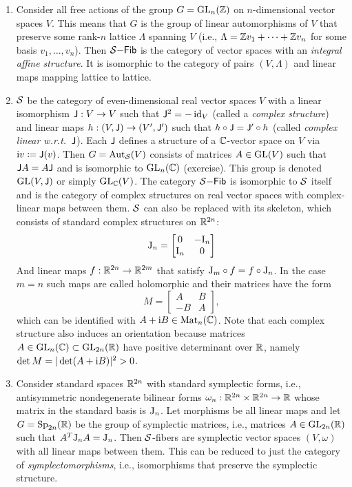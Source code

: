 \begin{example}
\begin{enumerate}
        \item Consider all free actions of the group $G=\operatorname{GL}_n(\mathbb{Z})$ on $n$-dimensional vector spaces $V$. This means that $G$ is the group of linear automorphisms of $V$ that preserve some rank-$n$ lattice $\Lambda$ spanning $V$ (i.e., $\Lambda=\mathbb{Z} v_1+\cdots +\mathbb{Z} v_n$ for some basis $v_1,\ldots,v_n$). Then $\mathcal{S}\mathsf{-Fib}$ is the category of vector spaces with an \emph{integral affine structure}. It is isomorphic to the category of pairs $(V,\Lambda)$ and linear maps mapping lattice to lattice.

        \item $\mathcal{S}$ be the category of even-dimensional real vector spaces $V$ with a linear isomorphism $\mathsf{J}:V\to V$ such that $\mathsf{J}^2=-\operatorname{id}_V$ (called a \emph{complex structure}) and linear maps $h:(V,\mathsf{J})\to(V',\mathsf{J}')$ such that $h\circ \mathsf{J}=\mathsf{J}'\circ h$ (called \emph{complex linear w.r.t.\ $\mathsf{J}$}). Each $\mathsf{J}$ defines a structure of a $\mathbb{C}$-vector space on $V$ via $\mathrm{i} v\coloneqq\mathsf{J}(v)$. Then $G=\operatorname{Aut}_{\mathcal{S}}(V)$ consists of matrices $A\in\operatorname{GL}(V)$ such that $\mathsf{J} A=A\mathsf{J}$ and is isomorphic to $\operatorname{GL}_n(\mathbb{C})$ (exercise). This group is denoted $\operatorname{GL}(V,\mathsf{J})$ or simply $\operatorname{GL}_{\mathbb{C}}(V)$. The category $\mathcal{S}\mathsf{-Fib}$ is isomorphic to $\mathcal{S}$ itself and is the category of complex structures on real vector spaces with complex-linear maps between them. $\mathcal{S}$ can also be replaced with its skeleton, which consists of standard complex structures on $\mathbb{R}^{2n}$:
        \[\mathrm{J}_{n}=\begin{bmatrix}
            0&-\mathrm{I}_n\\
            \mathrm{I}_n&0
        \end{bmatrix}\]
        And linear maps $f:\mathbb{R}^{2n}\to \mathbb{R}^{2m}$ that satisfy $\mathrm{J}_{m}\circ f=f\circ \mathrm{J}_{n}$. In the case $m=n$ such maps are called holomorphic and their matrices have the form 
        \[M=\begin{bmatrix}
            A&B\\
            -B&A
        \end{bmatrix},\label{eq complex matrices}\]
        which can be identified with $A+\mathrm{i} B\in \operatorname{Mat}_n(\mathbb{C})$.
        Note that each complex structure also induces an orientation because matrices $A\in \operatorname{GL}_n(\mathbb{C})\subset \operatorname{GL}_{2n}(\mathbb{R})$ have positive determinant over $\mathbb{R}$, namely $\det M=|\det(A+\mathrm{i} B)|^2>0$.

        \item Consider standard spaces $\mathbb{R}^{2n}$ with standard symplectic forms, i.e., antisymmetric nondegenerate bilinear forms $\omega_n:\mathbb{R}^{2n}\times \mathbb{R}^{2n}\to \mathbb{R}$ whose matrix in the standard basis is $\mathrm{J}_{n}$. Let morphisms be all linear maps and let $G=\operatorname{Sp}_{2n}(\mathbb{R})$ be the group of symplectic matrices, i.e., matrices $A\in\operatorname{GL}_{2n}(\mathbb{R})$ such that $A^T\mathrm{J}_{n}A=\mathrm{J}_{n}$. Then $\mathcal{S}$-fibers are symplectic vector spaces $(V,\omega)$ with all linear maps between them. This can be reduced to just the category of \emph{symplectomorphisms}, i.e., isomorphisms that preserve the symplectic structure.
    \end{enumerate}
\end{example}



